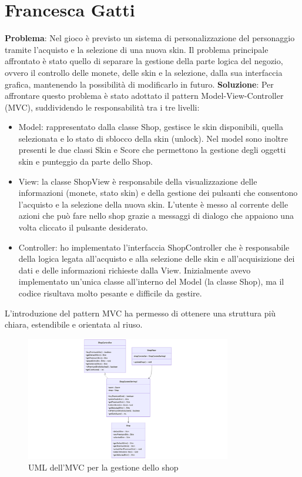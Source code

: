 \documentclass[a4paper,12pt]{report}
\begin{document}
\section{Francesca Gatti}
\textbf{Problema}: Nel gioco è previsto un sistema di personalizzazione del personaggio tramite l'acquisto e la selezione di una nuova skin.
Il problema principale affrontato è stato quello di separare la gestione della parte logica del negozio, ovvero il controllo delle monete, 
delle skin e la selezione, dalla sua interfaccia grafica, mantenendo la possibilità di modificarlo in futuro.
\textbf{Soluzione}: Per affrontare questo problema è stato adottato il pattern Model-View-Controller (MVC), suddividendo le responsabilità 
tra i tre livelli:
\begin{itemize}
    \item Model: rappresentato dalla classe Shop, gestisce le skin disponibili, quella selezionata e lo stato di sblocco della skin (unlock). 
    Nel model sono inoltre presenti le due classi Skin e Score che permettono la gestione degli oggetti skin e punteggio da parte dello Shop.
    \item View: la classe ShopView è responsabile della visualizzazione delle informazioni (monete, stato skin) e della gestione dei pulsanti 
    che consentono l'acquisto e la selezione della nuova skin. L'utente è messo al corrente delle azioni che può fare nello shop grazie a 
    messaggi di dialogo che appaiono una volta cliccato il pulsante desiderato.
    \item Controller: ho implementato l'interfaccia ShopController che è responsabile della logica legata all'acquisto e alla selezione 
    delle skin e all'acquisizione dei dati e delle informazioni richieste dalla View. Inizialmente avevo implementato un'unica classe 
    all'interno del Model (la classe Shop), ma il codice risultava molto pesante e difficile da gestire.
\end{itemize}
L'introduzione del pattern MVC ha permesso di ottenere una struttura più chiara, estendibile e orientata al riuso.
\begin{figure}
    \centering
    \includegraphics[width=0.8\textwidth]{resources/UMLshopMVC.png}
    \caption{UML dell'MVC per la gestione dello shop}
    \label{fig: 2.2}
\end{figure}
\end{document}
